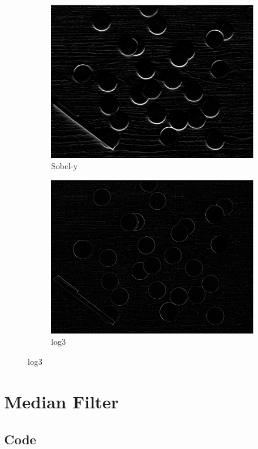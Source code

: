 \documentclass[14pt]{article}
\begin{document}
\begin{figure}[hbt!]
		\begin{subfigure}[b]{0.23\linewidth}
			\includegraphics[width=\linewidth]{k7.png}
			\caption{Sobel-y}
		\end{subfigure}
		\begin{subfigure}[b]{0.23\linewidth}
			\includegraphics[width=\linewidth]{log3.png}
			\caption{log3}
		\end{subfigure}
	\end{figure}
	\section{Median Filter}
	\subsection{Code}
	
\end{document}
